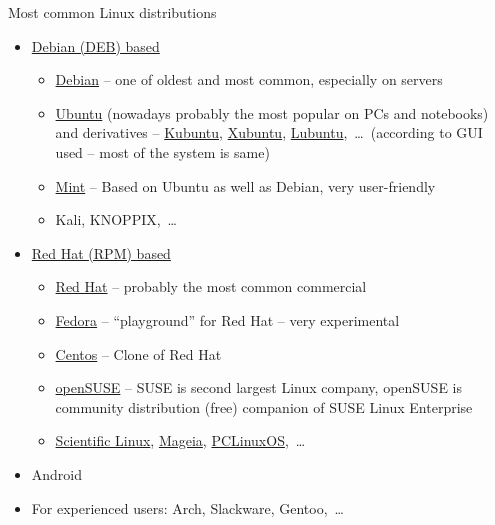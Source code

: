 \documentclass[compress, ucs, xelatex, 11pt, xcolor=svgnames,
  hyperref={
    bookmarks=true,
    unicode=true,
    colorlinks=true,
    pdftitle={Linux, command line and MetaCentrum},
    plainpages=false,
    pdfauthor={Vojtech Zeisek},
    pdfsubject={Course about use of Linux command line, writing shell scripts and using MetaCentrum of CESNET},
    pdfcreator={XeLaTeX},
    pdfkeywords={Linux, GNU, BASH, shell, command line, MetaCentrum},
    linkcolor=DarkRed,
    anchorcolor=DarkBlue,
    citecolor=Indigo,
    filecolor=NavyBlue,
    menucolor=DarkMagenta,
    urlcolor=DarkBlue,
    pdftex},
  url={hyphens, lowtilde} %
  ]{beamer}
\begin{document}
\begin{frame}{Most common Linux distributions}
  \begin{itemize}
    \item \href{http://distrowatch.com/search.php?package=DEB}{Debian (DEB) based}
    \begin{itemize}
      \item \href{https://www.debian.org/}{Debian} -- one of oldest and most common, especially on servers
      \item \href{http://www.ubuntu.com/}{Ubuntu} (nowadays probably the most popular on PCs and notebooks) and derivatives -- \href{https://www.kubuntu.org/}{Kubuntu}, \href{https://xubuntu.org/}{Xubuntu}, \href{http://lubuntu.net/}{Lubuntu},~\ldots~(according to GUI used -- most of the system is same)
      \item \href{http://linuxmint.com/}{Mint} -- Based on Ubuntu as well as Debian, very user-friendly
      \item Kali, KNOPPIX,~\ldots
    \end{itemize}
    \item \href{http://distrowatch.com/search.php?package=RPM}{Red Hat (RPM) based}
    \begin{itemize}
      \item \href{https://www.redhat.com/}{Red Hat} -- probably the most common commercial
      \item \href{https://getfedora.org/}{Fedora} -- ``playground'' for Red Hat -- very experimental
      \item \href{https://www.centos.org/}{Centos} -- Clone of Red Hat
      \item \href{https://www.opensuse.org/}{openSUSE} -- SUSE is second largest Linux company, openSUSE is community distribution (free) companion of SUSE Linux Enterprise
      \item \href{https://www.scientificlinux.org/}{Scientific Linux}, \href{https://www.mageia.org/}{Mageia}, \href{http://www.pclinuxos.com/}{PCLinuxOS},~\ldots
    \end{itemize}
    \item Android
    \item For experienced users: Arch, Slackware, Gentoo,~\ldots
  \end{itemize}
\end{frame}
\end{document}
